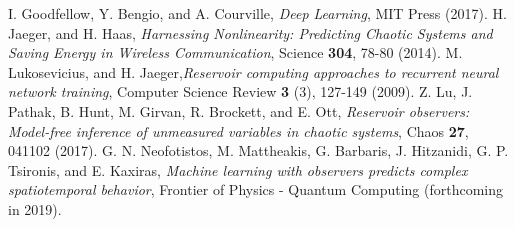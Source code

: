 \documentclass[12pt,letterpaper]{article}
\begin{document}
\begin{thebibliography}{99}
 I. Goodfellow, Y. Bengio, and A. Courville, \textit{Deep Learning}, MIT Press (2017).
%
  H. Jaeger, and H. Haas, \textit{Harnessing Nonlinearity: Predicting
Chaotic Systems and Saving Energy in Wireless Communication}, Science {\bf 304}, 78-80 (2014).
%
 M. Lukosevicius, and H. Jaeger,\textit{Reservoir computing approaches to recurrent neural network training}, Computer Science Review {\bf 3} (3), 127-149 (2009).
%
 Z. Lu, J. Pathak, B. Hunt, M. Girvan, R. Brockett, and E. Ott, \textit{Reservoir observers: Model-free inference of unmeasured variables in chaotic systems}, Chaos {\bf 27}, 041102 (2017).
 G. N. Neofotistos, M. Mattheakis, G. Barbaris, J. Hitzanidi, G. P. Tsironis, and E. Kaxiras,  \textit{Machine learning with observers predicts complex spatiotemporal behavior}, Frontier of  Physics - Quantum Computing (forthcoming in 2019).
\end{thebibliography}
\end{document}
